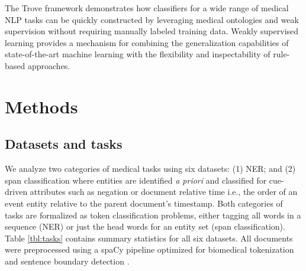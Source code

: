 \documentclass{article}
\begin{document}
The Trove framework demonstrates how classifiers for a wide range of medical NLP tasks can be quickly constructed by leveraging medical ontologies and weak supervision without requiring manually labeled training data. 
Weakly supervised learning provides a mechanism for combining the generalization capabilities of state-of-the-art machine learning with the flexibility and inspectability of rule-based approaches.








\section*{Methods}
\label{sec:methods}

\subsection*{Datasets and tasks}
We analyze two categories of medical tasks using six datasets: (1) NER; and (2) span classification where entities are identified \emph{a priori} and classified for cue-driven attributes such as negation or document relative time i.e., the order of an event entity relative to the parent document's timestamp. 
Both categories of tasks are formalized as token classification problems, either tagging all words in a sequence (NER) or just the head words for an entity set (span classification). 
Table \ref{tbl:tasks} contains summary statistics for all six datasets.
All documents were preprocessed using a spaCy \cite{Honnibal2017-si} pipeline optimized for biomedical tokenization and sentence boundary detection \cite{Callahan2019-mz}.
\end{document}

